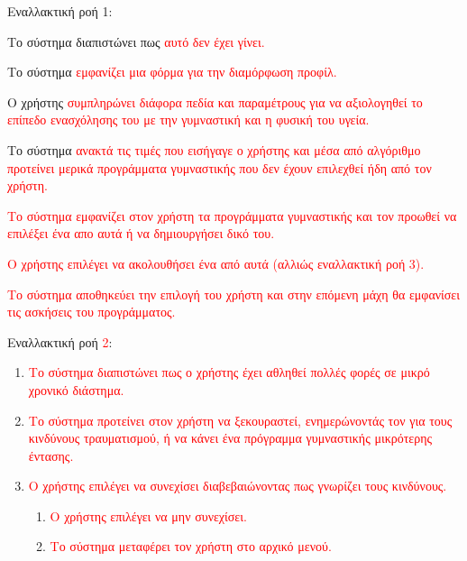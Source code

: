Εναλλακτική ροή 1:
\begin{enumerate}[label=2.\alph*.,ref=2.\alph*]
    \item Το σύστημα διαπιστώνει πως \textcolor{red}{αυτό δεν έχει γίνει.}
    \item Το σύστημα \textcolor{red}{εμφανίζει μια φόρμα για την διαμόρφωση προφίλ.}
    \item Ο χρήστης \textcolor{red}{συμπληρώνει διάφορα πεδία και παραμέτρους για να αξιολογηθεί το επίπεδο ενασχόλησης του με την γυμναστική και η φυσική του υγεία.}
    \item Το σύστημα \textcolor{red}{ανακτά τις τιμές που εισήγαγε ο χρήστης και μέσα από αλγόριθμο προτείνει μερικά προγράμματα γυμναστικής που δεν έχουν επιλεχθεί ήδη από τον χρήστη.}
    \item \textcolor{red}{Το σύστημα εμφανίζει στον χρήστη τα προγράμματα γυμναστικής και τον προωθεί να επιλέξει ένα απο αυτά ή να δημιουργήσει δικό του.
    \item Ο χρήστης επιλέγει να ακολουθήσει ένα από αυτά (αλλιώς εναλλακτική ροή 3).
    \item Το σύστημα αποθηκεύει την επιλογή του χρήστη και στην επόμενη μάχη θα εμφανίσει τις ασκήσεις του προγράμματος.}
\end{enumerate}

Εναλλακτική ροή \textcolor{red}{2}:
\begin{enumerate}[label=4.\alph*.,ref=4.\alph*]

    \item \textcolor{red}{Το σύστημα διαπιστώνει πως ο χρήστης έχει αθληθεί πολλές φορές σε μικρό χρονικό διάστημα.}
    \item \textcolor{red}{Το σύστημα προτείνει στον χρήστη να ξεκουραστεί, ενημερώνοντάς τον για τους κινδύνους τραυματισμού, ή να κάνει ένα πρόγραμμα γυμναστικής μικρότερης έντασης.}
    \item \textcolor{red}{Ο χρήστης επιλέγει να συνεχίσει διαβεβαιώνοντας πως γνωρίζει τους κινδύνους.}
\begin{enumerate}[label=4.\alph*.,ref=4.\alph*]
    \item \textcolor{red}{Ο χρήστης επιλέγει να μην συνεχίσει.}
    \item \textcolor{red}{Το σύστημα μεταφέρει τον χρήστη στο αρχικό μενού.}
\end{enumerate}
\end{enumerate}

